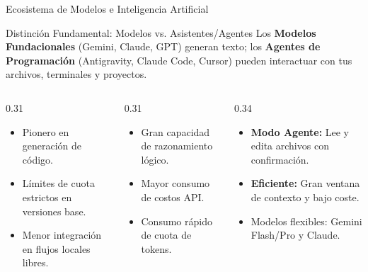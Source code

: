 \documentclass[aspectratio=169, 10pt]{beamer}
\begin{document}
\begin{frame}{Ecosistema de Modelos e Inteligencia Artificial}
  \begin{block}{Distinción Fundamental: Modelos vs. Asistentes/Agentes}
    \small
    Los \textbf{Modelos Fundacionales} (Gemini, Claude, GPT) generan texto; los \textbf{Agentes de Programación} (Antigravity, Claude Code, Cursor) pueden interactuar con tus archivos, terminales y proyectos.
  \end{block}

  \vspace{0.1cm}
  \begin{columns}[T]
    \begin{column}{0.31\textwidth}
      \begin{tcolorbox}[colback=white,colframe=pucpDarkGray,title=\textbf{OpenAI GPT / Codex},fonttitle=\bfseries\tiny,boxrule=0.5pt,top=1.2mm,bottom=1.2mm]
        \tiny
        \begin{itemize}
          \item Pionero en generación de código.
          \item Límites de cuota estrictos en versiones base.
          \item Menor integración en flujos locales libres.
        \end{itemize}
      \end{tcolorbox}
    \end{column}

    \begin{column}{0.31\textwidth}
      \begin{tcolorbox}[colback=white,colframe=pucpDarkGray,title=\textbf{Anthropic Claude Code},fonttitle=\bfseries\tiny,boxrule=0.5pt,top=1.2mm,bottom=1.2mm]
        \tiny
        \begin{itemize}
          \item Gran capacidad de razonamiento lógico.
          \item Mayor consumo de costos API.
          \item Consumo rápido de cuota de tokens.
        \end{itemize}
      \end{tcolorbox}
    \end{column}

    \begin{column}{0.34\textwidth}
      \begin{tcolorbox}[colback=pucpLightBlue!40,colframe=pucpRed,title=\textbf{Google Antigravity},fonttitle=\bfseries\tiny,boxrule=0.5pt,top=1.2mm,bottom=1.2mm]
        \tiny
        \begin{itemize}
          \item \textbf{Modo Agente:} Lee y edita archivos con confirmación.
          \item \textbf{Eficiente:} Gran ventana de contexto y bajo coste.
          \item Modelos flexibles: Gemini Flash/Pro y Claude.
        \end{itemize}
      \end{tcolorbox}
    \end{column}
  \end{columns}
\end{frame}
\end{document}
